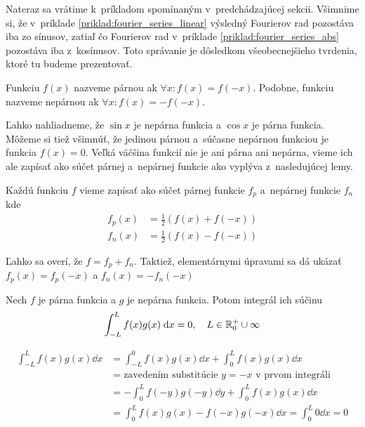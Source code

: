 Nateraz sa vrátime k~príkladom spomínaným v~predchádzajúcej sekcii.
Všimnime si, že v~príklade \ref{priklad:fourier_series_linear} 
výsledný Fourierov rad pozostáva iba zo sínusov, zatiaľ čo Fourierov
rad v~príklade
\ref{priklad:fourier_series_abs} pozostáva iba z~kosínusov. Toto
správanie je dôsledkom všeobecnejšieho tvrdenia, ktoré tu budeme
prezentovať.
\begin{definicia}
    Funkciu $f(x)$ nazveme párnou ak
    $\forall x: f(x) = f(-x)$. Podobne, funkciu nazveme nepárnou ak
    $\forall x: f(x) = - f(-x)$.
\end{definicia}
Ľahko nahliadneme, že $\sin x$ je nepárna funkcia a $\cos x$ je párna
funkcia. Môžeme si tiež všimnúť, že jedinou párnou a~súčasne nepárnou
funkciou je funkcia $f(x)=0$.
Veľká väčšina funkcií nie je ani párna ani nepárna, vieme ich ale
zapísať ako súčet párnej a~nepárnej funkcie ako vyplýva z~nasledujúcej
lemy.
\begin{lema}
    Každú funkciu $f$ vieme zapísať ako súčet párnej funkcie $f_p$
    a~nepárnej funkcie $f_n$ kde
    \begin{align*}
        f_p(x) &= \frac{1}{2} (f(x) + f(-x)) \\
        f_n(x) &= \frac{1}{2} (f(x) - f(-x))
    \end{align*}
\end{lema}
\begin{dokaz}
    Ľahko sa overí, že $f = f_p + f_n$. Taktiež, elementárnymi
    úpravami sa dá ukázať $f_p(x) = f_p(-x)$ a $f_n(x) = - f_n(-x)$
\end{dokaz}

\begin{veta}
    Nech $f$ je párna funkcia a $g$ je nepárna funkcia. Potom integrál
    ich súčinu
    \begin{equation*}
        \int_{-L}^{L} f(x) g(x) \; \mathrm{d} x = 0, \quad L \in {\mathbb R}_0^+ \cup
        \infty
    \end{equation*}
    \label{veta:int_parna_neparna}
\end{veta}
\begin{dokaz}
    \begin{equation*}
    \begin{split}
      \int_{-L}^{L} f(x) g(x) \dd x &= 
                \int_{-L}^0 f(x) g(x) \dd x +
                \int_0^L f(x) g(x) \dd x \\
            &= \text{zavedením substitúcie $y=-x$ v prvom integráli}
            \\
            &= - \int_{0}^{L} f(-y) g(-y) \dd y + 
                \int_0^L f(x) g(x) \dd x \\
            &= \int_0^L f(x) g(x) - f(-x) g(-x) \dd x 
             = \int_0^L 0 \dd x= 0
    \end{split}
    \end{equation*}
\end{dokaz}

